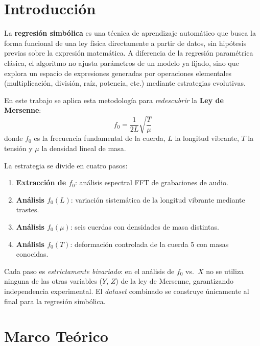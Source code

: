 \documentclass[12pt,a4paper]{article}
\begin{document}
\tableofcontents
\newpage

\section{Introducción}

La \textbf{regresión simbólica} es una técnica de aprendizaje automático
que busca la forma funcional de una ley física directamente a partir de
datos, sin hipótesis previas sobre la expresión matemática. A diferencia
de la regresión paramétrica clásica, el algoritmo no ajusta parámetros de
un modelo ya fijado, sino que explora un espacio de expresiones generadas
por operaciones elementales (multiplicación, división, raíz, potencia, etc.)
mediante estrategias evolutivas.

En este trabajo se aplica esta metodología para \emph{redescubrir} la
\textbf{Ley de Mersenne}:
\begin{equation}
  \boxed{f_0 = \frac{1}{2L}\sqrt{\frac{T}{\mu}}}
  \label{eq:mersenne}
\end{equation}
donde $f_0$ es la frecuencia fundamental de la cuerda, $L$ la longitud
vibrante, $T$ la tensión y $\mu$ la densidad lineal de masa.

La estrategia se divide en cuatro pasos:
\begin{enumerate}
  \item \textbf{Extracción de $f_0$}: análisis espectral FFT de grabaciones de audio.
  \item \textbf{Análisis $f_0(L)$}: variación sistemática de la longitud vibrante mediante trastes.
  \item \textbf{Análisis $f_0(\mu)$}: seis cuerdas con densidades de masa distintas.
  \item \textbf{Análisis $f_0(T)$}: deformación controlada de la cuerda 5 con masas conocidas.
\end{enumerate}

Cada paso es \emph{estrictamente bivariado}: en el análisis de $f_0$ vs.\ $X$
no se utiliza ninguna de las otras variables ($Y$, $Z$) de la ley de Mersenne,
garantizando independencia experimental. El \emph{dataset} combinado se
construye únicamente al final para la regresión simbólica.

\section{Marco Teórico}
\end{document}
